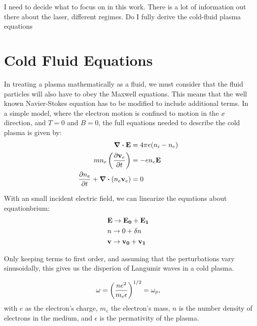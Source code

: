 \documentclass[12pt, titlepage]{caesar_book}
\begin{document}
I need to decide what to focus on in this work. There is a lot of information out there about the laser, different regimes. Do I fully derive the cold-fluid plasma equations
\section{Cold Fluid Equations}

In treating a plasma mathematically as a fluid, we must consider that the fluid particles
will also have to obey the Maxwell equations. This means that the well known Navier-Stokes
equation has to be modified to include additional terms. In a simple model, where the electron
motion is confined to motion in the $x$ direction, and $T=0$ and $B=0$, the full equations
needed to describe the cold plasma is given by:
\begin{subequations}
    \begin{align}
        \div{\vb{E}} & = 4 \pi e \qty(n_i-n_e) \\
    m n_e \left( \pdv{\vb{v}_e}{t} \right) &= -e n_e \vb{E} \\
        \pdv{n_e}{t} + \div{ \qty(n_e \vb{v}_e)} & = 0\\
    \end{align}
\end{subequations}

With an small incident electric field, we can linearize the equations about
equationbrium:
\begin{align*}
    &\vb{E} \rightarrow \vb{E_0} + \vb{E_1}\\
    &n \rightarrow 0 + \delta n \\
    &\vb{v} \rightarrow \vb{v_0} + \vb{v_1}
\end{align*}

Only keeping terms to first order, and assuming that the perturbations vary sinusoidally,
this gives us the disperion of Langumir waves in a cold plasma. 

\begin{equation}
\label{eq:dispersion}
\omega = \qty(\frac{ne^2}{m_e \epsilon})^{1/2} = \omega_p,
\end{equation}
with $e$ as the electron's charge, $m_e$ the electron's mass, $n$ is the number
density of electrons in the medium, and $\epsilon$ is the permativity of the plasma.
\end{document}
